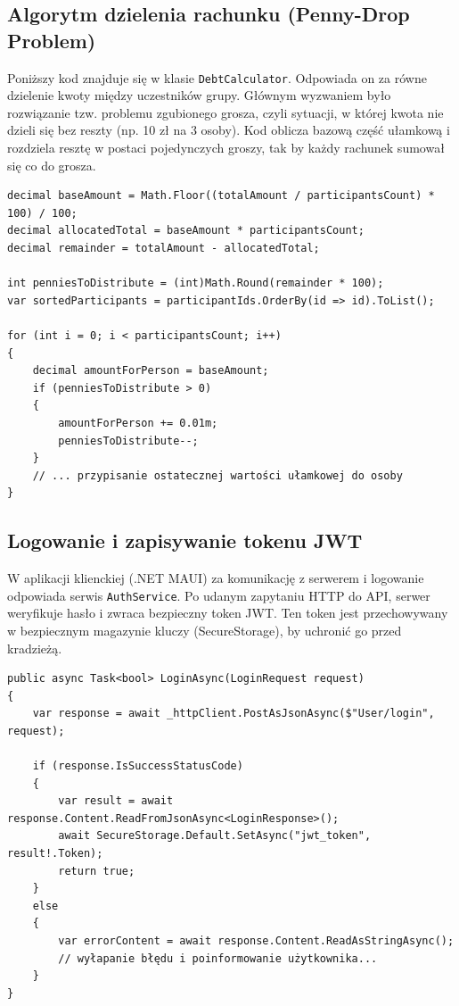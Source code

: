 \documentclass[12pt, a4paper]{article}
\begin{document}
\subsection{Algorytm dzielenia rachunku (Penny-Drop Problem)}
Poniższy kod znajduje się w klasie \texttt{DebtCalculator}. Odpowiada on za równe dzielenie kwoty między uczestników grupy. Głównym wyzwaniem było rozwiązanie tzw. problemu zgubionego grosza, czyli sytuacji, w której kwota nie dzieli się bez reszty (np. 10 zł na 3 osoby). Kod oblicza bazową część ułamkową i rozdziela resztę w postaci pojedynczych groszy, tak by każdy rachunek sumował się co do grosza.
\begin{center}
\begin{verbatim}
decimal baseAmount = Math.Floor((totalAmount / participantsCount) * 100) / 100;
decimal allocatedTotal = baseAmount * participantsCount;
decimal remainder = totalAmount - allocatedTotal;

int penniesToDistribute = (int)Math.Round(remainder * 100);
var sortedParticipants = participantIds.OrderBy(id => id).ToList();

for (int i = 0; i < participantsCount; i++)
{
    decimal amountForPerson = baseAmount;
    if (penniesToDistribute > 0)
    {
        amountForPerson += 0.01m;
        penniesToDistribute--;
    }
    // ... przypisanie ostatecznej wartości ułamkowej do osoby
}
\end{verbatim}
\end{center}

\subsection{Logowanie i zapisywanie tokenu JWT}
W aplikacji klienckiej (.NET MAUI) za komunikację z serwerem i logowanie odpowiada serwis \texttt{AuthService}. Po udanym zapytaniu HTTP do API, serwer weryfikuje hasło i zwraca bezpieczny token JWT. Ten token jest przechowywany w bezpiecznym magazynie kluczy (SecureStorage), by uchronić go przed kradzieżą.
\begin{center}
\begin{verbatim}
public async Task<bool> LoginAsync(LoginRequest request)
{
    var response = await _httpClient.PostAsJsonAsync($"User/login", request);

    if (response.IsSuccessStatusCode)
    {
        var result = await response.Content.ReadFromJsonAsync<LoginResponse>();
        await SecureStorage.Default.SetAsync("jwt_token", result!.Token);
        return true;
    }
    else
    {
        var errorContent = await response.Content.ReadAsStringAsync();
        // wyłapanie błędu i poinformowanie użytkownika...
    }
}
\end{verbatim}
\end{center}
\end{document}
